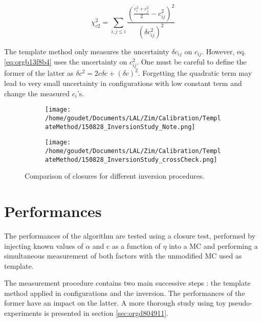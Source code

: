 \begin{equation}
\label{eq:orgb13f8b4}
\chi_{c2}^2 = \sum \limits_{i, j\leq i} \frac{ (\frac{c_i^2 + c_j^2}{2} - c_{ij}^2)^2 }{(\delta c_{ij}^2)^2}
\end{equation}

The template method only measures the uncertainty $\delta c_{ij}$ on $c_{ij}$.
However, eq. \ref{eq:orgb13f8b4} uses the uncertainty on $c_{ij}^2$.
One must be careful to define the former of the latter as $\delta c^2 = 2c\delta c + (\delta c)^2$.
Forgetting the quadratic term may lead to very small uncertainty in configurations with low constant term and change the measured $c_i$'s.

\begin{figure}
\begin{subfigure}[t]{0.49\linewidth}
\begin{center}
\texttt{[image: /home/goudet/Documents/LAL/Zim/Calibration/TemplateMethod/150828\_InversionStudy\_Note.png]}
\end{center}
\end{subfigure}
\begin{subfigure}[t]{0.49\linewidth}
\begin{center}
\texttt{[image: /home/goudet/Documents/LAL/Zim/Calibration/TemplateMethod/150828\_InversionStudy\_crossCheck.png]}
\end{center}
\end{subfigure}
\caption{\label{orgac9241c}
Comparison of closures for different inversion procedures.}
\end{figure}




\section{Performances}
\label{sec:orgf66efee}
\label{sec:Calibration_inSitu_TempPerf}

The performances of the algorithm are tested using a closure test, performed by injecting known values of $\alpha$ and c as a function of $\eta$ into a MC and performing a simultaneous measurement of both factors with the unmodified MC used as template.

The measurement procedure contains two main successive steps : the template method applied in configurations and the inversion.
The performances of the former have an impact on the latter.
A more thorough study using toy pseudo-experiments is presented in section \ref{sec:orgd804911}.

